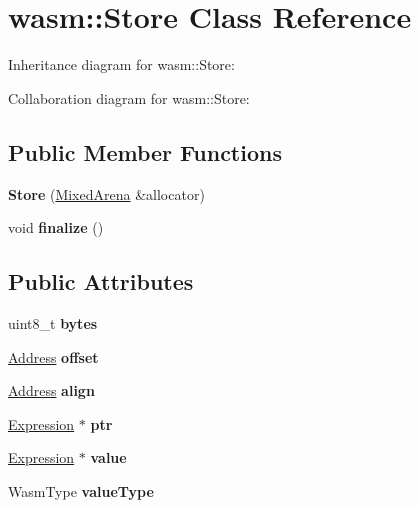 \hypertarget{classwasm_1_1_store}{}\section{wasm\+:\+:Store Class Reference}
\label{classwasm_1_1_store}


Inheritance diagram for wasm\+:\+:Store\+:


Collaboration diagram for wasm\+:\+:Store\+:
\subsection*{Public Member Functions}
\begin{DoxyCompactItemize}
\item 
\mbox{\label{classwasm_1_1_store_aa1c3db0f967088ee499d98264e6bf042}} 
{\bfseries Store} (\mbox{\hyperlink{struct_mixed_arena}{Mixed\+Arena}} \&allocator)
\item 
\mbox{\label{classwasm_1_1_store_ade771a2b6710438622318dc9ca008dff}} 
void {\bfseries finalize} ()
\end{DoxyCompactItemize}
\subsection*{Public Attributes}
\begin{DoxyCompactItemize}
\item 
\mbox{\label{classwasm_1_1_store_a032ca2693dbcdbaf6280f9b42c6683a9}} 
uint8\+\_\+t {\bfseries bytes}
\item 
\mbox{\label{classwasm_1_1_store_a8981d1b62dcab15608e9fbece4ad4d1f}} 
\mbox{\hyperlink{structwasm_1_1_address}{Address}} {\bfseries offset}
\item 
\mbox{\label{classwasm_1_1_store_acc0eb5a5ea9fb33d0de804ccd26118a9}} 
\mbox{\hyperlink{structwasm_1_1_address}{Address}} {\bfseries align}
\item 
\mbox{\label{classwasm_1_1_store_a892dd1f3174c1ac5ff7825beb03f38a7}} 
\mbox{\hyperlink{classwasm_1_1_expression}{Expression}} $\ast$ {\bfseries ptr}
\item 
\mbox{\label{classwasm_1_1_store_a8cee716e7ae17e8045a839da3a29d331}} 
\mbox{\hyperlink{classwasm_1_1_expression}{Expression}} $\ast$ {\bfseries value}
\item 
\mbox{\label{classwasm_1_1_store_a29252c6c3e6bc3345612965aa5af6c88}} 
Wasm\+Type {\bfseries value\+Type}
\end{DoxyCompactItemize}
